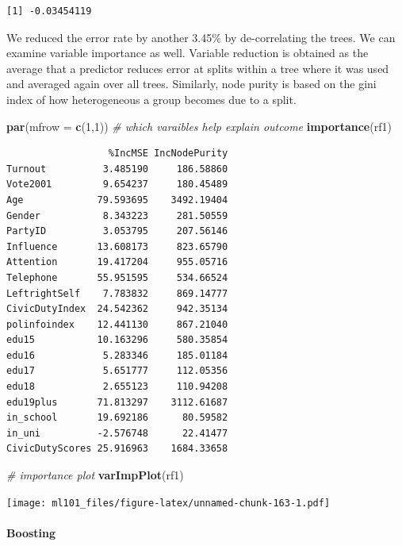 \documentclass[]{article}
\newenvironment{Shaded}{\begin{snugshade}}{\end{snugshade}}
\newcommand{\CommentTok}[1]{\textcolor[rgb]{0.56,0.35,0.01}{\textit{#1}}}
\newcommand{\DataTypeTok}[1]{\textcolor[rgb]{0.13,0.29,0.53}{#1}}
\newcommand{\DecValTok}[1]{\textcolor[rgb]{0.00,0.00,0.81}{#1}}
\newcommand{\KeywordTok}[1]{\textcolor[rgb]{0.13,0.29,0.53}{\textbf{#1}}}
\newcommand{\NormalTok}[1]{#1}
\let\oldparagraph\paragraph
\renewcommand{\paragraph}[1]{\oldparagraph{#1}\mbox{}}
\begin{document}
\begin{verbatim}
[1] -0.03454119
\end{verbatim}

We reduced the error rate by another 3.45\(\%\) by de-correlating the trees. We can examine variable importance as well. Variable reduction is obtained as the average that a predictor reduces error at splits within a tree where it was used and averaged again over all trees. Similarly, node purity is based on the gini index of how heterogeneous a group becomes due to a split.

\begin{Shaded}
\begin{Highlighting}[]
\KeywordTok{par}\NormalTok{(}\DataTypeTok{mfrow =} \KeywordTok{c}\NormalTok{(}\DecValTok{1}\NormalTok{,}\DecValTok{1}\NormalTok{))}
\CommentTok{# which varaibles help explain outcome}
\KeywordTok{importance}\NormalTok{(rf1)}
\end{Highlighting}
\end{Shaded}

\begin{verbatim}
                  %IncMSE IncNodePurity
Turnout          3.485190     186.58860
Vote2001         9.654237     180.45489
Age             79.593695    3492.19404
Gender           8.343223     281.50559
PartyID          3.053795     207.56146
Influence       13.608173     823.65790
Attention       19.417204     955.05716
Telephone       55.951595     534.66524
LeftrightSelf    7.783832     869.14777
CivicDutyIndex  24.542362     942.35134
polinfoindex    12.441130     867.21040
edu15           10.163296     580.35854
edu16            5.283346     185.01184
edu17            5.651777     112.05356
edu18            2.655123     110.94208
edu19plus       71.813297    3112.61687
in_school       19.692186      80.59582
in_uni          -2.576748      22.41477
CivicDutyScores 25.916963    1684.33658
\end{verbatim}

\begin{Shaded}
\begin{Highlighting}[]
\CommentTok{# importance plot}
\KeywordTok{varImpPlot}\NormalTok{(rf1)}
\end{Highlighting}
\end{Shaded}

\texttt{[image: ml101\_files/figure-latex/unnamed-chunk-163-1.pdf]}

\hypertarget{boosting}{%
\paragraph{Boosting}\label{boosting}}
\end{document}
